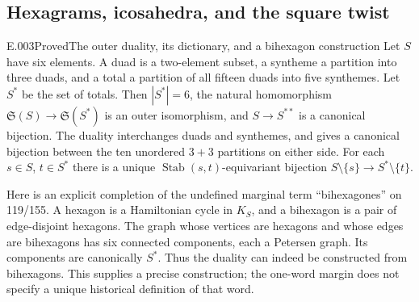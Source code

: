 \subsection{Hexagrams, icosahedra, and the square twist}
\begin{saresult}{E.003}{Proved}{The outer duality, its dictionary, and a bihexagon construction}
Let $S$ have six elements. A duad is a two-element subset, a syntheme a
partition into three duads, and a total a partition of all fifteen duads
into five synthemes. Let $S^*$ be the set of totals. Then $|S^*|=6$, the
natural homomorphism $\mathfrak S(S)\longrightarrow\mathfrak S(S^*)$ is an
outer isomorphism, and $S\longrightarrow S^{**}$ is a canonical bijection.
The duality interchanges duads and synthemes, and gives a canonical
bijection between the ten unordered $3+3$ partitions on either side.
For each $s\in S$, $t\in S^*$ there is a unique
$\operatorname{Stab}(s,t)$-equivariant bijection
$S\setminus\{s\}\longrightarrow S^*\setminus\{t\}$.

Here is an explicit completion of the undefined marginal term
``bihexagones'' on 119/155. A hexagon is a Hamiltonian cycle in $K_S$,
and a bihexagon is a pair of edge-disjoint hexagons. The graph whose
vertices are hexagons and whose edges are bihexagons has six connected
components, each a Petersen graph. Its components are canonically $S^*$.
Thus the duality can indeed be constructed from bihexagons. This supplies
a precise construction; the one-word margin does not specify a unique
historical definition of that word.
\end{saresult}
